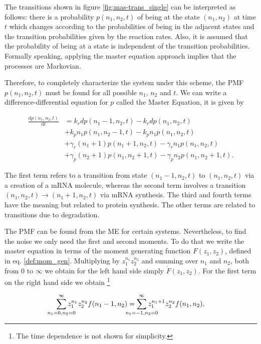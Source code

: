 The transitions shown in figure \ref{fig:mas-trans_single} can be interpreted as follows: there is a probability $p(n_1,n_2,t)$ of being at the state $(n_1,n_2)$ at time $t$ which changes according to the probabilities of being in the adjacent states and the transition probabilities given by the reaction rates. Also, it is assumed that the probability of being at a state is independent of the transition probabilities. Formally speaking, applying the master equation approach implies that the processes are Markovian.

Therefore, to completely characterize the system under this scheme, the PMF $p(n_1,n_2,t)$ must be found for all possible $n_1$, $n_2$ and $t$. We can write a difference-differential equation for $p$ called the Master Equation, it is given by

\begin{equation}
  \label{eq:master}
  \begin{split}
    \frac{\mathrm{d}p(n_1,n_2,t)}{\mathrm{d}t} &= k_rdp(n_1-1,n_2,t) - k_rdp(n_1,n_2,t)\\
&+ k_pn_1p(n_1,n_2-1,t) - k_pn_1p(n_1,n_2,t)\\
&+ \gamma_r(n_1+1)p(n_1+1,n_2,t) - \gamma_rn_1p(n_1,n_2,t)\\
&+ \gamma_p(n_2+1)p(n_1,n_2+1,t) - \gamma_pn_2p(n_1,n_2+1,t).
  \end{split}
\end{equation}

The first term refers to a transition from state $(n_1-1,n_2,t)$ to $(n_1,n_2,t)$ via a creation of a mRNA molecule, whereas the second term involves a transition $(n_1,n_2,t) \rightarrow (n_1+1,n_2,t)$ via mRNA synthesis. The third and fourth terms have the meaning but related to protein synthesis. The other terms are related to transitions due to degradation.

The PMF can be found from the ME for certain systems. Nevertheless, to find the noise we only need the first and second moments. To do that we write the master equation in terms of the moment generating function $F(z_1,z_2)$, defined in eq. \eqref{def:mom_gen}. Multiplying by $z_1^{n_1}z_2^{n_2}$ and summing over $n_1$ and $n_2$, both from $0$ to $\infty$ we obtain for the left hand side simply $\dot{F}(z_1,z_2)$. For the first term on the right hand side we obtain \footnote{The time dependence is not shown for simplicity.}

\begin{equation*}
  \sum_{\mathclap{n_1=0,n_2=0}}^\infty z_1^{n_1}z_2^{n_2}f(n_1-1,n_2) = \sum_{\mathclap{n_1=-1,n_2=0}}^\infty z_1^{n_1+1}z_2^{n_2}f(n_1,n_2),
\end{equation*}

